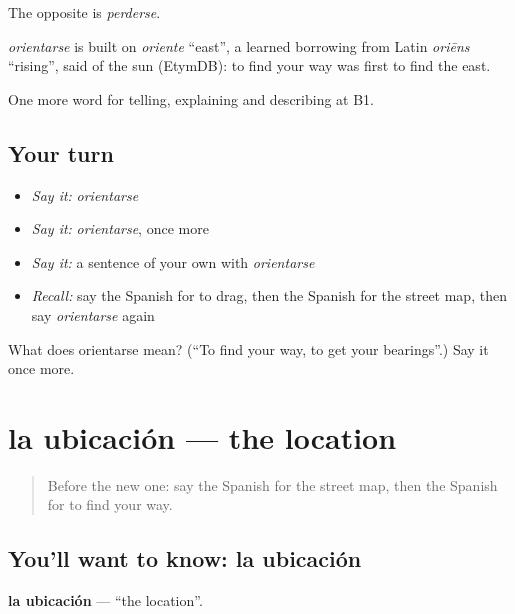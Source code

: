 The opposite is \emph{perderse}.

\begin{cousinweb}
\emph{orientarse} is built on \emph{oriente} \textquotedblleft{}east\textquotedblright{}, a learned borrowing from Latin \emph{oriēns} \textquotedblleft{}rising\textquotedblright{}, said of the sun (EtymDB): to find your way was first to find the east.
\end{cousinweb}

\begin{grammarlens}[title={What you've built}]
One more word for telling, explaining and describing at B1.
\end{grammarlens}

\subsection*{Your turn}
\begin{itemize}
\raggedright
  \item \emph{Say it:} \emph{orientarse}
  \item \emph{Say it:} \emph{orientarse}, once more
  \item \emph{Say it:} a sentence of your own with \emph{orientarse}
  \item \emph{Recall:} say the Spanish for to drag, then the Spanish for the street map, then say \emph{orientarse} again
\end{itemize}

\begin{tcolorbox}[breakable,colback=teal!4,colframe=teal!35!black,title={Before you move on}]
What does orientarse mean? (\textquotedblleft{}To find your way, to get your bearings\textquotedblright{}.) Say it once more.
\end{tcolorbox}
\section[la ubicación]{la ubicación — the location}

\label{lesson:ES-C669-ubicacion}



\begin{quote}
Before the new one: say the Spanish for the street map, then the Spanish for to find your way.
\end{quote}

\subsection*{You'll want to know: la ubicación}
\textbf{la ubicación} — \textquotedblleft{}the location\textquotedblright{}.

